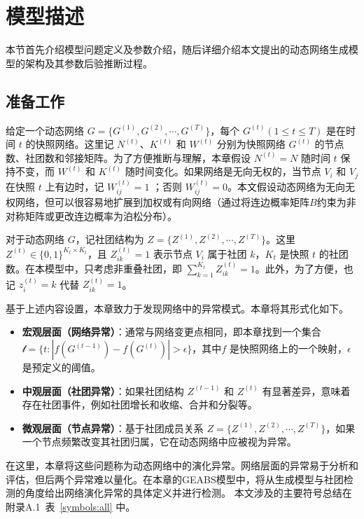 \section{模型描述\label{chap4:model}}

\label{sec:method}
本节首先介绍模型问题定义及参数介绍，随后详细介绍本文提出的动态网络生成模型的架构及其参数后验推断过程。


\subsection{准备工作}
给定一个动态网络 $G =\{ G^{(1)}, G^{(2)}, \cdots, G^{(T)} \}$，每个 $G^{(t)} (1 \le t \le T)$ 是在时间 $t$ 的快照网络。这里记 $N^{(t)}$、$K^{(t)}$ 和 $W^{(t)}$ 分别为快照网络 $G^{(t)}$ 的节点数、社团数和邻接矩阵。为了方便推断与理解，本章假设 $N^{(t)} = N$ 随时间 $t$ 保持不变，而 $W^{(t)}$ 和 $K^{(t)}$ 随时间变化。如果网络是无向无权的，当节点 $V_i$ 和 $V_j$ 在快照 $t$ 上有边时，记 $W^{(t)}_{ij} = 1$ ；否则 $W^{(t)}_{ij} = 0$。本文假设动态网络为无向无权网络，但可以很容易地扩展到加权或有向网络（通过将连边概率矩阵$B$约束为非对称矩阵或更改连边概率为泊松分布）。

对于动态网络 $G$，记社团结构为 $Z = \{ Z^{(1)}, Z^{(2)}, \cdots, Z^{(T)} \}$。这里 $Z^{(t)} \in \{0, 1 \}^{K_t \times K_t}$，且 $Z^{(t)}_{ik} = 1$ 表示节点 $V_i$ 属于社团 $k$，$K_t$ 是快照 $t$ 的社团数。在本模型中，只考虑非重叠社团，即 $\sum_{k=1}^{K_t} Z^{(t)}_{ik} = 1$。此外，为了方便，也记 $z^{(t)}_{i} = k$ 代替 $Z^{(t)}_{ik} = 1$。



基于上述内容设置，本章致力于发现网络中的异常模式。本章将其形式化如下。
\begin{itemize}
    \item \textbf{宏观层面（网络异常）}：通常与网络变更点相同，即本章找到一个集合 $\mathcal{t} = \{t : |f(G^{(t-1)}) -f(G^{(t)})| > \epsilon  \} $，其中$f$ 是快照网络上的一个映射，$\epsilon$是预定义的阈值。
    \item \textbf{中观层面（社团异常）}：如果社团结构 $Z^{(t-1)}$ 和 $Z^{(t)}$ 有显著差异，意味着存在社团事件，例如社团增长和收缩、合并和分裂等。
    \item \textbf{微观层面（节点异常）}：基于社团成员关系 $Z = \{ Z^{(1)}, Z^{(2)}, \cdots, Z^{(T)} \}$，如果一个节点频繁改变其社团归属，它在动态网络中应被视为异常。
\end{itemize}

在这里，本章将这些问题称为动态网络中的演化异常。网络层面的异常易于分析和评估，但后两个异常难以量化。在本章的GEABS模型中，将从生成模型与社团检测的角度给出网络演化异常的具体定义并进行检测。
本文涉及的主要符号总结在附录A.1~表~\ref{symbols:all} 中。

